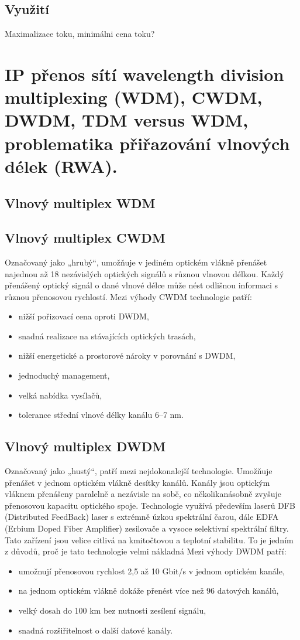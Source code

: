 \subsection{Využití}
Maximalizace toku, minimálni cena toku?


\newpage
\section{IP přenos sítí wavelength division multiplexing (WDM), CWDM, DWDM, TDM versus WDM, problematika přiřazování vlnových délek (RWA).}
\subsection{Vlnový multiplex WDM}

\subsection{Vlnový multiplex CWDM }
Označovaný jako „hrubý“, umožňuje v jediném optickém vlákně přenášet najednou až 18 nezávislých optických signálů s různou vlnovou délkou. Každý přenášený optický signál o dané vlnové délce může nést odlišnou informaci s různou přenosovou rychlostí.
Mezi výhody CWDM technologie patří:
\begin{itemize}
    \item nižší pořizovací cena oproti DWDM,
    \item snadná realizace na stávajících optických trasách,
    \item nižší energetické a prostorové nároky v porovnání s DWDM,
    \item jednoduchý management,
    \item velká nabídka vysílačů,
    \item tolerance střední vlnové délky kanálu 6–7 nm.
\end{itemize}

\subsection{Vlnový multiplex DWDM}
Označovaný jako „hustý“, patří mezi nejdokonalejší technologie. Umožňuje přenášet v jednom optickém vlákně desítky kanálů. Kanály jsou optickým vláknem přenášeny paralelně a nezávisle na sobě, co několikanásobně zvyšuje přenosovou kapacitu optického spoje. Technologie využívá především laserů DFB (Distributed FeedBack) laser s extrémně úzkou spektrální čarou, dále EDFA (Erbium Doped Fiber Amplifier) zesilovače a vysoce selektivní
spektrální filtry. Tato zařízení jsou velice citlivá na kmitočtovou a teplotní stabilitu. To je jedním z důvodů, proč je tato technologie velmi nákladná
Mezi výhody DWDM patří: 
\begin{itemize}
    \item umožnují přenosovou rychlost 2,5 až 10 Gbit/s v jednom optickém kanále,
    \item na jednom optickém vlákně dokáže přenést více než 96 datových kanálů,
    \item velký dosah do 100 km bez nutnosti zesílení signálu,
    \item snadná rozšiřitelnost o další datové kanály.
\end{itemize}

